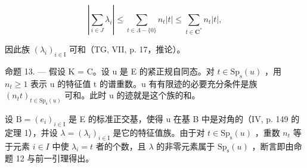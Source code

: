 \[
\left| \sum_ {i \in J} \lambda_ {i} \right| \leqslant \sum_ {t \in \Lambda - \{0 \}} n _ {t} | t | \leqslant \sum_ {t \in \mathbf {C} ^ {*}} n _ {t} | t |,
\]

因此族 \((\lambda_{i})_{i\in\mathrm{I}}\) 可和（TG, VII, p. 17，推论）。

命题 13. --- 假设 K = C。设 u 是 E 的紧正规自同态。对 \(t \in \mathrm{Sp}_{\mathrm{s}}(u)\) ，用 \(n_{t} \geqslant 1\) 表示 u 的特征值 t 的谱重数。u 有有限迹的必要充分条件是族 \((n_{t}t)_{t \in \mathrm{Sp}_{\mathrm{s}}(u)}\) 可和。此时 u 的迹就是这个族的和。

设 \(\mathrm{B} = (e_i)_{i \in \mathrm{I}}\) 是 E 的标准正交基，使得 u 在基 B 中是对角的（IV, p. 149 的定理 1），并设 \(\lambda = (\lambda_i)_{i \in \mathrm{I}}\) 是它的特征值族。由于对 \(t \in \mathrm{Sp}_\mathrm{s}(u)\) ，重数 \(n_t\) 等于元素 \(i \in I\) 中使 \(\lambda_i = t\) 者的个数，且 \(\lambda\) 的非零元素属于 \(\mathrm{Sp}_{\mathrm{s}}(u)\) ，断言即由命题 12 与前一引理得出。

